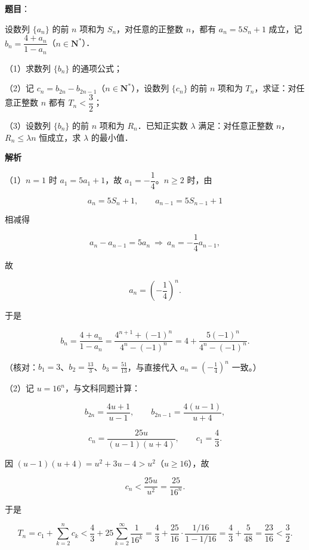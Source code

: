 \begin{answer}

\textbf{题目}：

设数列 $\{a_n\}$ 的前 $n$ 项和为 $S_n$，对任意的正整数 $n$，都有 $a_n=5S_n+1$ 成立，记 $b_n=\dfrac{4+a_n}{1-a_n}$（$n\in\mathbf N^*$）．

（1）求数列 $\{b_n\}$ 的通项公式；

（2）记 $c_n=b_{2n}-b_{2n-1}$（$n\in\mathbf N^*$），设数列 $\{c_n\}$ 的前 $n$ 项和为 $T_n$，求证：对任意正整数 $n$ 都有 $T_n<\dfrac32$；

（3）设数列 $\{b_n\}$ 的前 $n$ 项和为 $R_n$．已知正实数 $\lambda$ 满足：对任意正整数 $n$，$R_n\leqslant\lambda n$ 恒成立，求 $\lambda$ 的最小值．

\textbf{解析}

（1）$n=1$ 时 $a_1=5a_1+1$，故 $a_1=-\dfrac14$。$n\geqslant2$ 时，由

\nopagebreak[4]
\[a_n=5S_n+1,\qquad a_{n-1}=5S_{n-1}+1\]

相减得

\nopagebreak[4]
\[a_n-a_{n-1}=5a_n\ \Longrightarrow\ a_n=-\frac14a_{n-1},\]

故

\nopagebreak[4]
\[a_n=\left(-\frac14\right)^n .\]

于是

\nopagebreak[4]
\[b_n=\frac{4+a_n}{1-a_n}
=\frac{4^{n+1}+(-1)^n}{4^n-(-1)^n}
=4+\frac{5(-1)^n}{4^n-(-1)^n}.\]

（核对：$b_1=3$、$b_2=\frac{13}3$、$b_3=\frac{51}{13}$，与直接代入 $a_n=\left(-\frac14\right)^n$ 一致。）

（2）记 $u=16^n$，与文科同题计算：

\nopagebreak[4]
\[b_{2n}=\frac{4u+1}{u-1},\qquad
b_{2n-1}=\frac{4(u-1)}{u+4},\]

\nopagebreak[4]
\[c_n=\frac{25u}{(u-1)(u+4)},\qquad c_1=\frac43 .\]

因 $(u-1)(u+4)=u^2+3u-4>u^2$（$u\geqslant16$），故

\nopagebreak[4]
\[c_n<\frac{25u}{u^2}=\frac{25}{16^n}.\]

于是

\nopagebreak[4]
\[T_n=c_1+\sum_{k=2}^{n}c_k
<\frac43+25\sum_{k=2}^{\infty}\frac1{16^k}
=\frac43+\frac{25}{16}\cdot\frac{1/16}{1-1/16}
=\frac43+\frac5{48}=\frac{23}{16}<\frac32 .\]


\end{answer}
